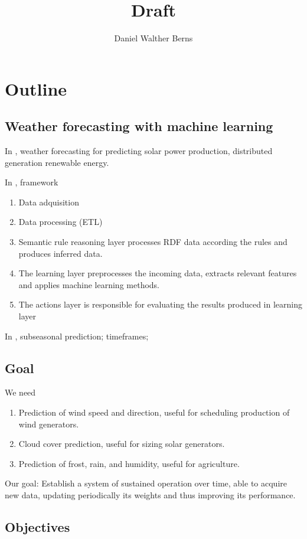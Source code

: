 \documentclass[10pt,a4paper]{article}
\author{Daniel Walther Berns}
\title{Draft}
\begin{document}
	\maketitle
	\section{Outline}
	    \subsection{Weather forecasting with machine learning}

In \cite{SSIS2011}, weather forecasting for predicting solar power production, distributed generation renewable energy.

In \cite{OBOD2017}, framework
\begin{enumerate}
	\item Data adquisition
	\item Data processing (ETL)
	\item Semantic rule reasoning layer processes RDF data according the rules and produces inferred data.
	\item The learning layer preprocesses the incoming data, extracts relevant features and applies machine learning methods.
	\item The actions layer is responsible for evaluating the results produced in learning layer
\end{enumerate}

In \cite{weyn2021sub}, subseasonal prediction; timeframes; 

\subsection{Goal}

We need 
\begin{enumerate}
	\item Prediction of wind speed and direction, useful for scheduling production of wind generators.
	\item Cloud cover prediction, useful for sizing solar generators.
	\item Prediction of frost, rain, and humidity, useful for agriculture.
\end{enumerate}

Our goal:
 Establish a system of sustained operation over time, able to acquire new data, updating periodically its weights and thus improving its performance.


\subsection{Objectives}
\end{document}
